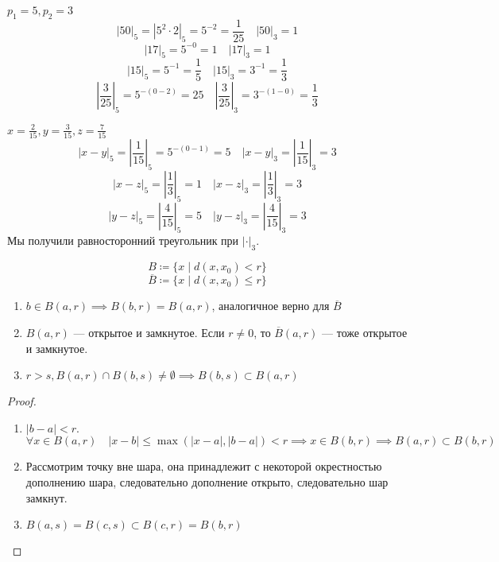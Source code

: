 \begin{example}
    \(p_1 = 5, p_2 = 3\)
    \[|50|_5 = |5^2\cdot 2|_5 = 5^{-2} = \frac{1}{25} \quad |50|_3 = 1\] 
    \[|17|_5 = 5^{-0} = 1 \quad |17|_3 = 1\] 
    \[|15|_5 = 5^{-1} = \frac{1}{5} \quad |15|_3 = 3^{-1} = \frac{1}{3}\] 
    \[\left|\frac{3}{25}\right|_5 = 5^{-(0-2)} = 25 \quad \left|\frac{3}{25}\right|_3 = 3^{-(1-0)} = \frac{1}{3}\] 
\end{example}

\begin{example}
    \(x = \frac{2}{15}, y = \frac{3}{15}, z = \frac{7}{15}\) 
    \[|x-y|_5 = \left|\frac{1}{15}\right|_5 = 5^{-(0-1)} = 5
      \quad |x-y|_3 = \left|\frac{1}{15}\right|_3 = 3\] 
    \[|x-z|_5 = \left|\frac{1}{3}\right|_5 = 1
      \quad |x-z|_3 = \left|\frac{1}{3}\right|_3 = 3\] 
    \[|y-z|_5 = \left|\frac{4}{15}\right|_5 = 5
      \quad |y-z|_3 = \left|\frac{4}{15}\right|_3 = 3\] 
    Мы получили равносторонний треугольник при \(|\cdot|_3\).
\end{example}

\begin{definition}
    \[B \coloneqq \{x \mid d(x, x_0) < r\}\]
    \[\overline{B} \coloneqq \{x \mid d(x, x_0) \le r\}\]
\end{definition}

\begin{lemma}\itemfix
    \begin{enumerate}
        \item \(b \in B(a, r) \implies B(b, r) = B(a, r)\), аналогичное верно для \(\overline{B}\)
        \item \(B(a, r)\) --- открытое и замкнутое. Если \(r \neq 0\), то \(\overline{B}(a, r)\) --- тоже открытое и замкнутое.
        \item \(r > s, B(a, r) \cap B(b, s) \neq \emptyset \implies B(b, s) \subset B(a, r)\)
    \end{enumerate}
\end{lemma}
\begin{proof}\itemfix
    \begin{enumerate}
        \item \(|b-a| < r\).
            \[\forall x \in B(a, r) \quad |x-b| \le \max(|x-a|, |b-a|) < r \implies x \in B(b, r) \implies B(a, r) \subset B(b, r)\] 
        \item Рассмотрим точку вне шара, она принадлежит с некоторой окрестностью дополнению шара, следовательно дополнение открыто, следовательно шар замкнут.
        \item \(B(a, s) = B(c, s) \subset B(c, r) = B(b, r)\) 
    \end{enumerate}
\end{proof}


